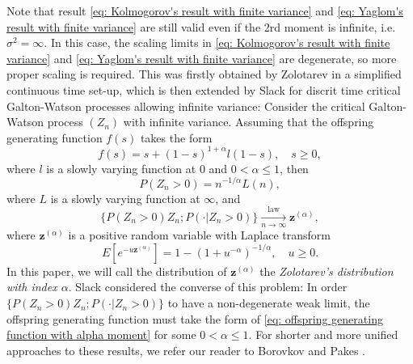 \documentclass[12pt, a4paper]{amsart}
\theoremstyle{definition}
\numberwithin{equation}{section}
\begin{document}
	Note that result \eqref{eq: Kolmogorov's result with finite variance} and \eqref{eq: Yaglom's result with finite variance} are still valid even if the 2rd moment is infinite, i.e. $\sigma^2 = \infty$.
	In this case, the scaling limits in \eqref{eq: Kolmogorov's result with finite variance} and \eqref{eq: Yaglom's result with finite variance} are degenerate, so more proper scaling is required.
	This was firstly obtained by Zolotarev \cite{Zolotarev1957More} in a simplified continuous time set-up,
	which is then extended by Slack \cite{Slack1968A-branching} for discrit time critical Galton-Watson processes allowing infinite variance:  Consider the critical Galton-Watson process $(Z_n)$ with infinite variance.
	Assuming that the offspring generating function $f(s)$ takes the form
\[\label{eq: offspring generating function with alpha moment}
	f(s)
	= s + (1-s)^{1+ \alpha} l(1-s),
	\quad s\geq 0,
\]
	where $l$ is a slowly varying function at $0$ and $0 < \alpha \leq 1$, then
\[ \label{eq: extinction probability of critical GW process without 2rd moment}
	P(Z_n > 0) = n^{-1/\alpha} L(n),
\]
	where $L$ is a slowly varying function at $\infty$, and
\[\label{eq: conditional distribution of critical GW process without 2rd moment}
	\big\{ P(Z_n > 0) Z_n; P(\cdot | Z_n > 0)\big\}
	\xrightarrow[n\to \infty]{\operatorname{law}} \mathbf z^{(\alpha)},
\]
	where $\mathbf z^{(\alpha)}$ is a positive random variable with Laplace transform
\[
	E[e^{- u \mathbf z^{(\alpha)}}]
	= 1 - (1+ u^{-\alpha})^{-1/\alpha},
	\quad u \geq 0.
\]
	In this paper, we will call the distribution of $\mathbf z^{(\alpha)}$ the \emph{Zolotarev's distribution with index $\alpha$}.
	Slack \cite{Slack1972Further} considered the converse of this problem:
	In order $\big\{ P(Z_n > 0) Z_n; P(\cdot | Z_n > 0)\big\}$ to have a non-degenerate weak limit, the offspring generating function must take the form of \eqref{eq: offspring generating function with alpha moment} for some $0 < \alpha \leq 1$.
	For shorter and more unified approaches to these results, we refer our reader to Borovkov \cite{Borovkov1989Method} and Pakes \cite{Pakes2010Critical}.
\end{document}
